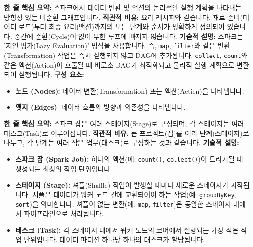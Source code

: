 \documentclass[11pt,a4paper]{article}
\theoremstyle{definition}
\begin{document}
\begin{tcolorbox}[title=\textbf{DAG (Directed Acyclic Graph)}, colback=orange!5!white, colframe=orange!75!black, sharp corners, boxrule=0.8pt]
\textbf{한 줄 핵심 요약:} 스파크에서 데이터 변환 및 액션의 논리적인 실행 계획을 나타내는 방향성 있는 비순환 그래프입니다.
\textbf{직관적 비유:} 요리 레시피와 같습니다. 재료 준비(데이터 로드)부터 최종 요리(액션)까지의 모든 단계와 순서가 명확하게 정의되어 있습니다. 중간에 순환(Cycle)이 없어 무한 루프에 빠지지 않습니다.
\textbf{기술적 설명:} 스파크는 '지연 평가(Lazy Evaluation)' 방식을 사용합니다. 즉, \texttt{map}, \texttt{filter}와 같은 변환(Transformation) 작업은 즉시 실행되지 않고 DAG에 추가됩니다. \texttt{collect}, \texttt{count}와 같은 액션(Action)이 호출될 때 비로소 DAG가 최적화되고 물리적 실행 계획으로 변환되어 실행됩니다.
\textbf{구성 요소:}
\begin{itemize}
    \item \textbf{노드 (Nodes):} 데이터 변환(Transformation) 또는 액션(Action)을 나타냅니다.
    \item \textbf{엣지 (Edges):} 데이터 흐름의 방향과 의존성을 나타냅니다.
\end{itemize}
\end{tcolorbox}

\begin{tcolorbox}[title=\textbf{스파크 잡(Job)의 구성}, colback=orange!5!white, colframe=orange!75!black, sharp corners, boxrule=0.8pt]
\textbf{한 줄 핵심 요약:} 스파크 잡은 여러 스테이지(Stage)로 구성되며, 각 스테이지는 여러 태스크(Task)로 이루어집니다.
\textbf{직관적 비유:} 큰 프로젝트(잡)를 여러 단계(스테이지)로 나누고, 각 단계는 여러 작은 업무(태스크)로 구성하는 것과 같습니다.
\textbf{기술적 설명:}
\begin{itemize}
    \item \textbf{스파크 잡 (Spark Job):} 하나의 액션(예: \texttt{count()}, \texttt{collect()})이 트리거될 때 생성되는 최상위 작업 단위입니다.
    \item \textbf{스테이지 (Stage):} 셔플(Shuffle) 작업이 발생할 때마다 새로운 스테이지가 시작됩니다. 셔플은 데이터가 워커 노드 간에 교환되어야 하는 작업(예: \texttt{groupByKey}, \texttt{sort})을 의미합니다. 셔플이 없는 변환(예: \texttt{map}, \texttt{filter})은 동일한 스테이지 내에서 파이프라인으로 처리됩니다.
    \item \textbf{태스크 (Task):} 각 스테이지 내에서 워커 노드의 코어에서 실행되는 가장 작은 작업 단위입니다. 데이터 파티션 하나당 하나의 태스크가 할당됩니다.
\end{itemize}
\end{tcolorbox}
\end{document}
